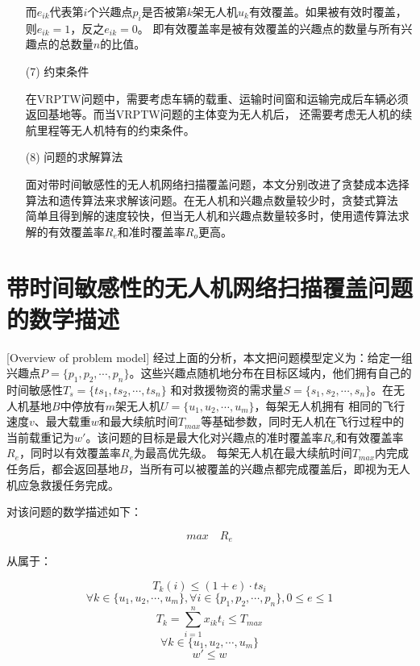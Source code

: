 \begin{itemize}
	\qquad 而$e_{ik}$代表第$i$个兴趣点$p_i$是否被第$k$架无人机$u_k$有效覆盖。如果被有效时覆盖，则$e_{ik} = 1$，反之$e_{ik} = 0$。
	即有效覆盖率是被有效覆盖的兴趣点的数量与所有兴趣点的总数量$n$的比值。

	\item[(7)]
	约束条件
	

	\qquad 在VRPTW问题中，需要考虑车辆的载重、运输时间窗和运输完成后车辆必须返回基地等。而当VRPTW问题的主体变为无人机后，
	还需要考虑无人机的续航里程等无人机特有的约束条件。

	\item[(8)]
	问题的求解算法


	\qquad 面对带时间敏感性的无人机网络扫描覆盖问题，本文分别改进了贪婪成本选择算法和遗传算法来求解该问题。在无人机和兴趣点数量较少时，贪婪式算法
	简单且得到解的速度较快，但当无人机和兴趣点数量较多时，使用遗传算法求解的有效覆盖率$R_e$和准时覆盖率$R_o$更高。
\end{itemize}


\section{带时间敏感性的无人机网络扫描覆盖问题的数学描述}[Overview of problem model]
经过上面的分析，本文把问题模型定义为：给定一组兴趣点$P=\lbrace p_1, p_2, \cdots ,p_n \rbrace$。这些兴趣点随机地分布在目标区域内，他们拥有自己的时间敏感性$T_s=\lbrace ts_1, ts_2, \cdots ,ts_n \rbrace$
和对救援物资的需求量$S=\lbrace s_1, s_2, \cdots ,s_n \rbrace$。在无人机基地$B$中停放有$m$架无人机$U=\lbrace u_1, u_2, \cdots ,u_m \rbrace$，每架无人机拥有
相同的飞行速度$v$、最大载重$w$和最大续航时间$T_{max}$等基础参数，同时无人机在飞行过程中的当前载重记为$w \prime$。该问题的目标是最大化对兴趣点的准时覆盖率$R_o$和有效覆盖率$R_e$，同时以有效覆盖率$R_e$为最高优先级。
每架无人机在最大续航时间$T_{max}$内完成任务后，都会返回基地$B$，当所有可以被覆盖的兴趣点都完成覆盖后，即视为无人机应急救援任务完成。


对该问题的数学描述如下：

\begin{equation}
 {max}\quad{R_e} 
\end{equation}


从属于：


\begin{equation}
	T_k(i) \le (1+e) \cdot ts_i
\end{equation}
\begin{equation}
	{\forall} k\in \lbrace u_1, u_2, \cdots ,u_m \rbrace ,{\forall} i \in \lbrace p_1, p_2, \cdots ,p_n \rbrace,0\le e \le1
\end{equation}
\begin{equation}
	T_k = \sum_{i=1}^n x_{ik}t_i \le T_{max}
\end{equation}
\begin{equation}
	{\forall} k\in \lbrace u_1, u_2, \cdots ,u_m \rbrace
\end{equation}
\begin{equation}
	w \prime \le w
\end{equation}

